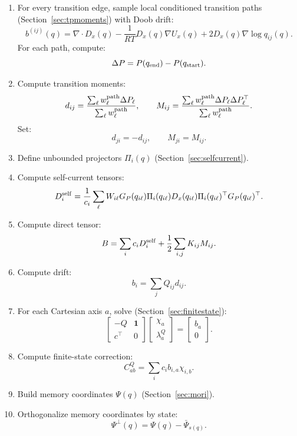 \documentclass[11pt]{article}
\newcommand{\one}{\mathbf 1}
\begin{document}
\begin{enumerate}
\item For every transition edge, sample local conditioned transition paths
(Section~\ref{sec:tpmoments}) with Doob drift:
\[
b^{(ij)}(q)
=
\nabla\cdot D_x(q)-\frac{1}{RT}D_x(q)\nabla U_x(q)
+
2D_x(q)\nabla\log q_{ij}(q).
\]
For each path, compute:
\[
\Delta P=P(q_{\rm end})-P(q_{\rm start}).
\]

\item Compute transition moments:
\[
d_{ij}
=
\frac{\sum_\ell w_\ell^{\rm path}\Delta P_\ell}
{\sum_\ell w_\ell^{\rm path}},
\qquad
M_{ij}
=
\frac{\sum_\ell w_\ell^{\rm path}\Delta P_\ell\Delta P_\ell^\top}
{\sum_\ell w_\ell^{\rm path}}.
\]
Set:
\[
d_{ji}=-d_{ij},
\qquad
M_{ji}=M_{ij}.
\]

\item Define unbounded projectors \(\Pi_i(q)\) (Section~\ref{sec:selfcurrent}).

\item Compute self-current tensors:
\[
D_i^{\rm self}
=
\frac{1}{c_i}
\sum_\ell
W_{i\ell}
G_P(q_{i\ell})
\Pi_i(q_{i\ell})
D_x(q_{i\ell})
\Pi_i(q_{i\ell})^\top
G_P(q_{i\ell})^\top.
\]

\item Compute direct tensor:
\[
B=
\sum_i c_iD_i^{\rm self}
+
\frac12\sum_{i,j}K_{ij}M_{ij}.
\]

\item Compute drift:
\[
b_i=\sum_jQ_{ij}d_{ij}.
\]

\item For each Cartesian axis \(a\), solve (Section~\ref{sec:finitestate}):
\[
\begin{bmatrix}
-Q & \one\\
c^\top & 0
\end{bmatrix}
\begin{bmatrix}
\chi_a\\
\lambda_a^Q
\end{bmatrix}
=
\begin{bmatrix}
b_a\\
0
\end{bmatrix}.
\]

\item Compute finite-state correction:
\[
C^Q_{ab}=\sum_i c_i b_{i,a}\chi_{i,b}.
\]

\item Build memory coordinates \(\Psi(q)\) (Section~\ref{sec:mori}).

\item Orthogonalize memory coordinates by state:
\[
\Psi^\perp(q)=\Psi(q)-\bar\Psi_{s(q)}.
\]


\end{enumerate}
\end{document}
